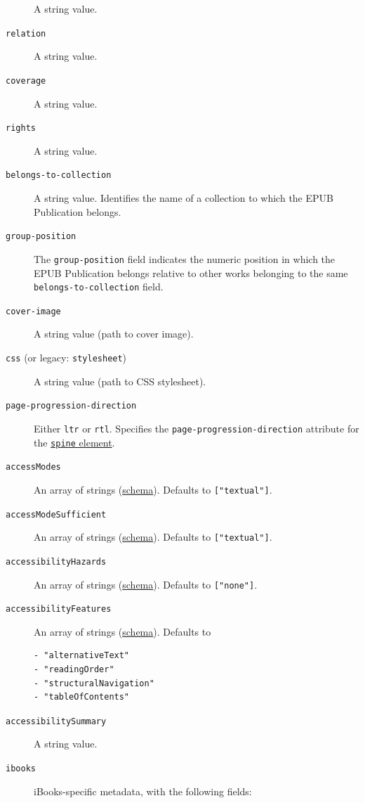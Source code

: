 \documentclass[
  b5paper
]{book}
\begin{document}
\begin{description}
A string value.
\item[\texttt{relation}]
A string value.
\item[\texttt{coverage}]
A string value.
\item[\texttt{rights}]
A string value.
\item[\texttt{belongs-to-collection}]
A string value. Identifies the name of a collection to which the EPUB
Publication belongs.
\item[\texttt{group-position}]
The \texttt{group-position} field indicates the numeric position in
which the EPUB Publication belongs relative to other works belonging to
the same \texttt{belongs-to-collection} field.
\item[\texttt{cover-image}]
A string value (path to cover image).
\item[\texttt{css} (or legacy: \texttt{stylesheet})]
A string value (path to CSS stylesheet).
\item[\texttt{page-progression-direction}]
Either \texttt{ltr} or \texttt{rtl}. Specifies the
\texttt{page-progression-direction} attribute for the
\href{http://idpf.org/epub/301/spec/epub-publications.html\#sec-spine-elem}{\texttt{spine}
element}.
\item[\texttt{accessModes}]
An array of strings
(\href{https://kb.daisy.org/publishing/docs/metadata/schema.org/index.html}{schema}).
Defaults to \texttt{{[}"textual"{]}}.
\item[\texttt{accessModeSufficient}]
An array of strings
(\href{https://kb.daisy.org/publishing/docs/metadata/schema.org/index.html}{schema}).
Defaults to \texttt{{[}"textual"{]}}.
\item[\texttt{accessibilityHazards}]
An array of strings
(\href{https://kb.daisy.org/publishing/docs/metadata/schema.org/index.html}{schema}).
Defaults to \texttt{{[}"none"{]}}.
\item[\texttt{accessibilityFeatures}]
An array of strings
(\href{https://kb.daisy.org/publishing/docs/metadata/schema.org/index.html}{schema}).
Defaults to

\begin{verbatim}
- "alternativeText"
- "readingOrder"
- "structuralNavigation"
- "tableOfContents"
\end{verbatim}
\item[\texttt{accessibilitySummary}]
A string value.
\item[\texttt{ibooks}]
iBooks-specific metadata, with the following fields:


\end{description}
\end{document}
